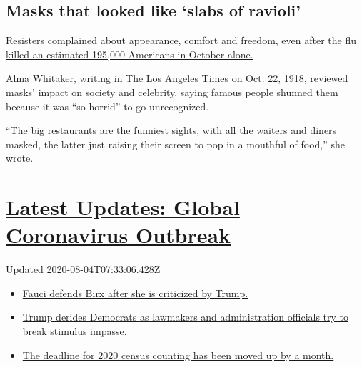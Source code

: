 \hypertarget{masks-that-looked-like-slabs-of-ravioli}{%
\subsection{Masks that looked like `slabs of
ravioli'}\label{masks-that-looked-like-slabs-of-ravioli}}

Resisters complained about appearance, comfort and freedom, even after
the flu
\href{https://www.cdc.gov/flu/pandemic-resources/1918-commemoration/pandemic-timeline-1918.htm}{killed
an estimated 195,000 Americans in October alone.}

Alma Whitaker, writing in The Los Angeles Times on Oct. 22, 1918,
reviewed masks' impact on society and celebrity, saying famous people
shunned them because it was ``so horrid'' to go unrecognized.

``The big restaurants are the funniest sights, with all the waiters and
diners masked, the latter just raising their screen to pop in a mouthful
of food,'' she wrote.

\hypertarget{latest-updates-global-coronavirus-outbreak}{%
\section{\texorpdfstring{\href{https://www.nytimes.com/2020/08/03/world/coronavirus-covid-19.html?action=click\&pgtype=Article\&state=default\&region=MAIN_CONTENT_1\&context=storylines_live_updates}{Latest
Updates: Global Coronavirus
Outbreak}}{Latest Updates: Global Coronavirus Outbreak}}\label{latest-updates-global-coronavirus-outbreak}}

Updated 2020-08-04T07:33:06.428Z

\begin{itemize}
\tightlist
\item
  \href{https://www.nytimes.com/2020/08/03/world/coronavirus-covid-19.html?action=click\&pgtype=Article\&state=default\&region=MAIN_CONTENT_1\&context=storylines_live_updates\#link-4547638f}{Fauci
  defends Birx after she is criticized by Trump.}
\item
  \href{https://www.nytimes.com/2020/08/03/world/coronavirus-covid-19.html?action=click\&pgtype=Article\&state=default\&region=MAIN_CONTENT_1\&context=storylines_live_updates\#link-15e7f995}{Trump
  derides Democrats as lawmakers and administration officials try to
  break stimulus impasse.}
\item
  \href{https://www.nytimes.com/2020/08/03/world/coronavirus-covid-19.html?action=click\&pgtype=Article\&state=default\&region=MAIN_CONTENT_1\&context=storylines_live_updates\#link-e5a2cda}{The
  deadline for 2020 census counting has been moved up by a month.}
\end{itemize}

